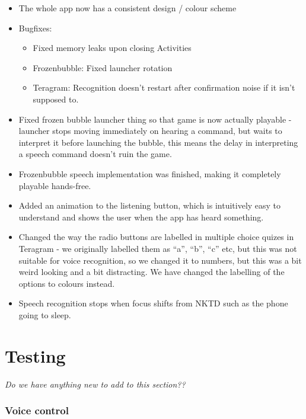 \documentclass[11pt, oneside]{article}
\begin{document}
\begin{itemize}

\item The whole app now has a consistent design / colour scheme

\item Bugfixes:
\begin{itemize}
	\item Fixed memory leaks upon closing Activities
	\item Frozenbubble: Fixed launcher rotation
	\item Teragram: Recognition doesn't restart after confirmation noise if it isn't supposed to.
\end{itemize}

\item Fixed frozen bubble launcher thing so that game is now actually playable - launcher stops moving immediately on hearing a command, but waits to interpret it before launching the bubble, this means the delay in interpreting a speech command doesn't ruin the game.

\item Frozenbubble speech implementation was finished, making it completely playable hands-free.

\item Added an animation to the listening button, which is intuitively easy to understand and shows the user when the app has heard something.

\item Changed the way the radio buttons are labelled in multiple choice quizes in Teragram - we originally labelled them as ``a'', ``b'', ``c'' etc, but this was not suitable for voice recognition, so we changed it to numbers, but this was a bit weird looking and a bit distracting. We have changed the labelling of the options to colours instead.

\item Speech recognition stops when focus shifts from NKTD such as the phone going to sleep. 
\end{itemize}

\pagebreak

\section{Testing}

{\em Do we have anything new to add to this section??}

\subsubsection*{Voice control}
\end{document}
